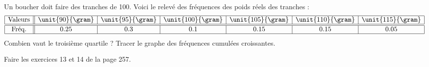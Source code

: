 
\begin{exercice}\label{exosmath-0534}

    Un boucher doit faire des tranches de \unit{100}{\gram}. Voici le relevé des fréquences des poids réels des tranches :
    \begin{equation*}
        \begin{array}[]{|c||c|c|c|c|c|c|}
            \hline
            \text{Valeurs}&\unit{90}{\gram}&\unit{95}{\gram}&\unit{100}{\gram}&\unit{105}{\gram}&\unit{110}{\gram}&\unit{115}{\gram}\\
            \hline\hline
            \text{Fréq.}&0.25&0.3&0.1&0.15&0.15&0.05\\
            \hline
        \end{array}
    \end{equation*}
    Combien vaut le troisième quartile ? Tracer le graphe des fréquences cumulées croissantes.

    Faire les exercices 13 et 14 de la page 257.

\end{exercice}
